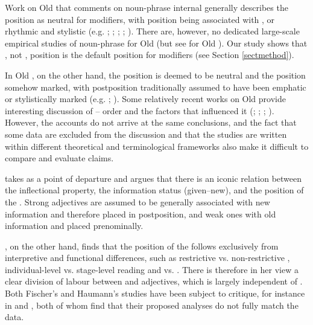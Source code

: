 \documentclass[output=paper,colorlinks,citecolor=brown,draft]{langscibook}
\begin{document}
Work on Old  that comments on noun-phrase internal  generally describes the  position as neutral for modifiers, with  position being associated with , or rhythmic and stylistic  (e.g. \cite{Iversen72}; \cite[28]{ValfellsCathey81}; \cite[67--8]{Faarlund04}; \cite{Barnes08}; \cite{Borjarsetal16}). There are, however, no dedicated large-scale empirical studies of noun-phrase  for Old  (but see  for Old ). Our study shows that , not , position is the default position for modifiers (see Section \ref{sectmethod}).
	
 In Old , on the other hand, the  position is deemed to be neutral and the  position somehow marked, with postposition traditionally assumed to have been emphatic or stylistically marked (e.g. \cite[78]{Mitchell85}; \cite[46]{Fischeretal00}). Some relatively recent works on Old  provide interesting discussion of – order and the factors that influenced it (\cite{Fischer00, Fischer01,Fischer06, Fischer12}; \cite{Haumann03, Haumann10}; \cite{Pysz09}; \cite{Grabski17, Grabski20}). However, the accounts do not arrive at the same conclusions, and the fact that some data are excluded from the discussion and that the studies are written within different theoretical and terminological frameworks also make it difficult to compare and evaluate claims. 
	
\citet{Fischer00, Fischer01, Fischer06, Fischer12} takes  as a point of departure and argues that there is an iconic relation between the inflectional property, the information status (given–new), and the position of the . Strong adjectives are assumed to be generally associated with new information and therefore placed in postposition, and weak ones with old information and placed prenominally. 
	
 \citet{Haumann03, Haumann10}, on the other hand, finds that the position of the  follows exclusively from interpretive and functional differences, such as restrictive vs. non-restrictive , individual-level vs. stage-level reading and  vs. . There is therefore in her view a clear division of labour between  and  adjectives, which is largely independent of . Both Fischer's and Haumann’s studies have been subject to critique, for instance in \citet{Grabski17} and \citet{Bech19}, both of whom find that their proposed analyses do not fully match the data. 
	
\end{document}

